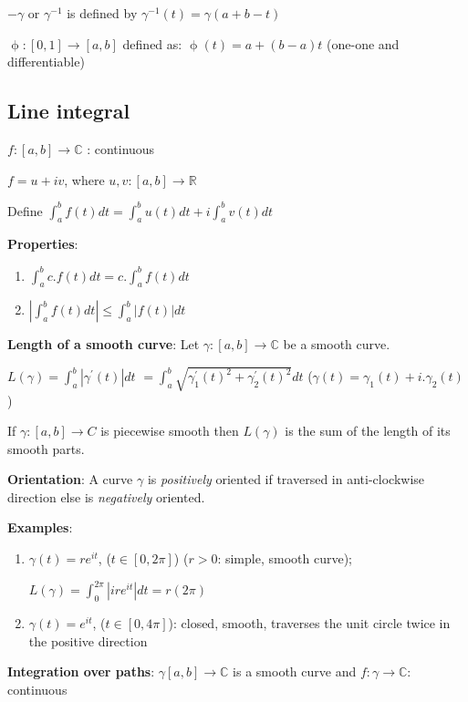 \documentclass{article}
\begin{document}
\begin{flushleft}
\begin{enumerate}
\end{enumerate}

$-\gamma$ or $\gamma^{-1}$ is defined by $\gamma^{-1}(t)=\gamma(a+b-t)$

$\upphi:[0,1]\rightarrow [a,b]$ defined as: $\upphi(t)=a+(b-a)t$ (one-one and differentiable)

\subsection{\textbf{Line integral}} 

$f:[a,b]\rightarrow \mathds{C}$ : continuous

$f=u+iv$, where $u,v:[a,b]\rightarrow \mathds{R}$

Define $\int_{a}^{b}f(t) dt= \int_{a}^{b}u(t) dt+ i \int_{a}^{b} v(t) dt$

\textbf{Properties}:

\begin{enumerate}
    \item $\int_{a}^{b} c.f(t) dt= c.\int_{a}^{b}f(t) dt$
    \item $| \int_{a}^{b}f(t) dt |\leq \int_{a}^{b}|f(t)| dt$
\end{enumerate}
\textbf{Length of a smooth curve}: Let $\gamma:[a,b]\rightarrow \mathds{C}$ be a smooth curve. 

$L(\gamma)= \int_{a}^{b} |\gamma^{'}(t)| dt$
$=\int_{a}^{b} \sqrt{\gamma_1^{'}(t)^2+\gamma_2^{'}(t)^2}  dt$     \: ($\gamma(t)=\gamma_1(t)+i.\gamma_2(t)$)

If $\gamma:[a,b]\rightarrow C$ is piecewise smooth then $L(\gamma)$ is the sum of the length of its smooth parts.

\textbf{Orientation}:  A curve $\gamma$ is \emph{positively} oriented if traversed in anti-clockwise direction else is \emph{negatively} oriented.

\textbf{Examples}:
\begin{enumerate}
    \item $\gamma(t)=re^{it}$, ($t\in [0,2\pi]$) ($r>0$: simple, smooth curve); 
    
    $L(\gamma)=\int_{0}^{2\pi} |ire^{it}| dt= r(2\pi)$
    
    \item $\gamma(t)=e^{it}$, ($t \in [0,4\pi]$): closed, smooth, traverses the unit circle twice in the positive direction
\end{enumerate}
\textbf{Integration over paths}:
$\gamma[a,b]\rightarrow \mathds{C}$ is a smooth curve and $f:\gamma \rightarrow \mathds{C}$: continuous 


\end{flushleft}
\end{document}
